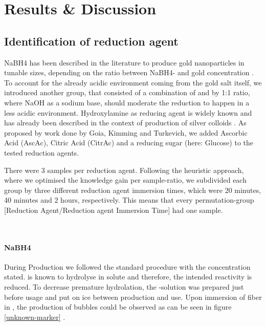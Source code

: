 \section{Results \& Discussion}
\label{sec:ResAndDisc}


\subsection{Identification of reduction agent}


NaBH4 has been described in the literature to produce gold nanoparticles in tunable sizes, depending on the ratio between NaBH4- and gold concentration \cite{NaBH4UsedForGoldNP}. To account for the already acidic environment coming from the gold salt itself, we introduced another group, that consisted of a combination of  and  by 1:1 ratio, where NaOH as a sodium base, should moderate the reduction to happen in a less acidic environment.
Hydroxylamine as reducing agent is widely known and has already been described in the context of production of silver colloids \cite{Leopold}.  
As proposed by work done by Goia, Kimming and Turkevich, we added Ascorbic Acid (AscAc), Citric Acid (CitrAc) and a reducing sugar (here: Glucose) to the tested reduction agents. \cite{Goia, Kimling, Frens}

There were 3 samples per reduction agent. Following the heuristic approach, where we optimised the knowledge gain per sample-ratio, we subdivided each group by three different reduction agent immersion times, which were 20 minutes, 40 minutes and 2 hours, respectively. This means that every permutation-group [Reduction Agent/Reduction agent Immersion Time] had one sample.

\\

\paragraph{NaBH4}
During Production we followed the standard procedure with the concentration stated.  is known to hydrolyse in solute and therefore, the intended reactivity is reduced. To decrease premature hydrolation, the -solution was prepared just before usage and put on ice between production and use. Upon immersion of fiber in , the production of bubbles could be observed as can be seen in figure \ref{unknown-marker} .

